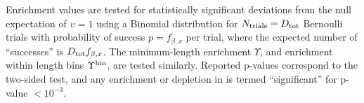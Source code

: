 Enrichment values are tested for statistically significant deviations from the null expectation of $\upsilon = 1$ using a Binomial distribution for $N_{\rm trials}=D_{\rm tot}$ Bernoulli trials with probability of success $p=f_{\beta,x}$ per trial, where the expected number of ``successes'' is $D_{\rm tot}f_{\beta,x}$.  The minimum-length enrichment $\Upsilon$, and enrichment within length bins $\Upsilon^{\rm bin}$, are tested similarly. Reported p-values correspond to the two-sided test, and any enrichment or depletion in \dSNPs is termed ``significant'' for p-value $< 10^{-3}$.
